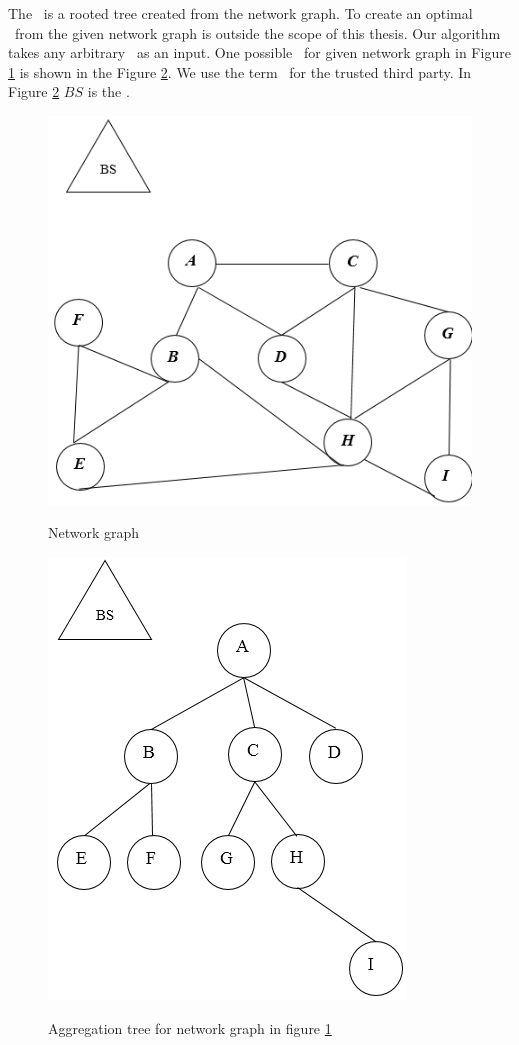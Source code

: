 	The \at\ is a rooted tree created from the network graph. 
	To create an optimal \at\ from the given network graph is outside the scope of this thesis.
	Our algorithm takes any arbitrary \at\ as an input. 
	One possible \at\ for given network graph in Figure \ref{fig:ng} is shown in the Figure \ref{fig:at}.
	We use the term \bs\  for the trusted third party. In Figure \ref{fig:at} $BS$ is the \bs.
		
	\begin{figure}[hp]
		\centering
		\includegraphics[scale = 0.6]{images/network-graph.png}\\
		\caption{Network graph}
		\label{fig:ng}
	\end{figure}

	\begin{figure}[hp]
		\centering
		\includegraphics[scale = 0.6]{images/aggregation-tree.png}\\
		\caption{Aggregation tree for network graph in figure \ref{fig:ng}}
		\label{fig:at}
	\end{figure}

